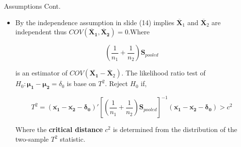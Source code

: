 \documentclass[8pt]{beamer}
\begin{document}
    \begin{frame}{Assumptions Cont.}
        \begin{itemize}
            \item By the independence assumption in slide (14) implies $\mathbf{\overline{X}}_{1}$ and $\mathbf{\overline{X}}_{2}$ are independent thus $COV(\mathbf{\overline{X}_{1}, \overline{X}_{2}}) = 0$.Where 
            
            \begin{equation}
                \left(\frac{1}{n_{1}} + \frac{1}{n_{2}}\right)\mathbf{S}_{pooled}
            \end{equation}
            
            is an estimator of $COV(\mathbf{\overline{X_{1}}} - \mathbf{\overline{X}}_{2})$. The likelihood ratio test of $H_{0}: \mathbf{\mu_{1} - \mu_{2}} = \delta_{0}$ is base on $T^{2}$. Reject $H_{0}$ if, 
            
            \begin{equation}
                T^{2} = (\mathbf{\overline{x_{1}} - \overline{x_{2}} - \delta_{0}})'\left[\left(\frac{1}{n_{1}} + \frac{1}{n_{2}}\right)\mathbf{S}_{pooled}\right]^{-1}(\mathbf{\overline{x_{1}} - \overline{x_{2}} - \delta_{0}}) > c^{2}
            \end{equation}
            
            Where the \textbf{critical distance} $c^{2}$ is determined from the distribution of the two-sample $T^{2}$ statistic.
            
        \end{itemize}
    \end{frame}
    
\end{document}
